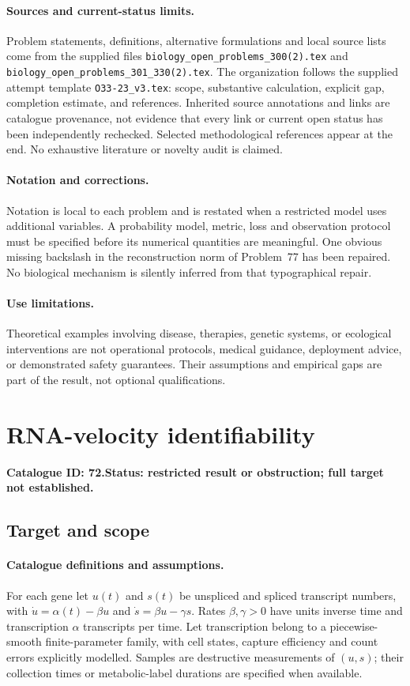 \documentclass[11pt]{article}
\begin{document}
\paragraph{Sources and current-status limits.}
Problem statements, definitions, alternative formulations and local source lists
come from the supplied files
\texttt{biology\_open\_problems\_300(2).tex} and
\texttt{biology\_open\_problems\_301\_330(2).tex}.
The organization follows the supplied attempt template
\texttt{O33-23\_v3.tex}: scope, substantive calculation, explicit gap,
completion estimate, and references. Inherited source annotations and links are
catalogue provenance, not evidence that every link or current open status has
been independently rechecked. Selected methodological references appear at the
end. No exhaustive literature or novelty audit is claimed.

\paragraph{Notation and corrections.}
Notation is local to each problem and is restated when a restricted model uses
additional variables. A probability model, metric, loss and observation protocol
must be specified before its numerical quantities are meaningful. One obvious
missing backslash in the reconstruction norm of Problem~77 has been repaired.
No biological mechanism is silently inferred from that typographical repair.

\paragraph{Use limitations.}
Theoretical examples involving disease, therapies, genetic systems, or ecological
interventions are not operational protocols, medical guidance, deployment advice,
or demonstrated safety guarantees. Their assumptions and empirical gaps are part
of the result, not optional qualifications.

\setcounter{section}{71}
\section{RNA-velocity identifiability}
\label{prob:072}
\noindent\textbf{Catalogue ID: 72.}\quad \textbf{Status: restricted result or obstruction; full target not established.}
\subsection{Target and scope}
\paragraph{Catalogue definitions and assumptions.}
For each gene let $u(t)$ and $s(t)$ be unspliced and spliced transcript numbers, with $\dot u=\alpha(t)-\beta u$ and $\dot s=\beta u-\gamma s$. Rates $\beta,\gamma>0$ have units inverse time and transcription $\alpha$ transcripts per time. Let transcription belong to a piecewise-smooth finite-parameter family, with cell states, capture efficiency and count errors explicitly modelled. Samples are destructive measurements of $(u,s)$; their collection times or metabolic-label durations are specified when available.
\end{document}
